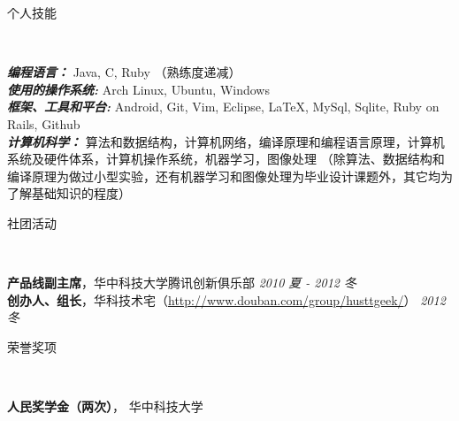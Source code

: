 \documentclass[9pt]{ctexart}
\newenvironment{changemargin}[2]{%
  \begin{list}{}{%
    \setlength{\topsep}{0pt}%
    \setlength{\leftmargin}{#1}%
    \setlength{\rightmargin}{#2}%
    \setlength{\listparindent}{\parindent}%
    \setlength{\itemindent}{\parindent}%
    \setlength{\parsep}{\parskip}%
  }%
  \item[]}{\end{list}
}
\newcommand{\lineover}{
	\begin{changemargin}{-0.05in}{-0.05in}
		\vspace*{-8pt}
		\hrulefill \\
		\vspace*{-2pt}
	\end{changemargin}
}
\newcommand{\header}[1]{
	\begin{changemargin}{-0.5in}{-0.5in}
		\scshape{#1}\\
  	\lineover
	\end{changemargin}
}
\newenvironment{body} {
	\vspace*{-16pt}
	\begin{changemargin}{-0.25in}{-0.5in}
  }	
	{\end{changemargin}
}
\begin{document}
\smallskip

\header{个人技能}

\begin{body}
	\vspace{14pt}
	\emph{\textbf{编程语言：}}{} Java, C, Ruby （熟练度递减）\\
	\medskip
	\emph{\textbf{使用的操作系统:}}{} Arch Linux, Ubuntu, Windows \\
	\medskip
	\emph{\textbf{框架、工具和平台:}}{} Android, Git, Vim, Eclipse, \LaTeX, MySql, Sqlite, Ruby on Rails, Github \\
	\medskip
	\emph{\textbf{计算机科学：}}{} 算法和数据结构，计算机网络，编译原理和编程语言原理，计算机系统及硬件体系，计算机操作系统，机器学习，图像处理 （除算法、数据结构和编译原理为做过小型实验，还有机器学习和图像处理为毕业设计课题外，其它均为了解基础知识的程度）

\end{body}

\smallskip


\header{社团活动}

\begin{body}
	\vspace{14pt}
	\textbf{产品线副主席}，华中科技大学腾讯创新俱乐部 \hfill {} \emph{2010 夏 - 2012 冬}\\
	\textbf{创办人、组长}，华科技术宅（\url{http://www.douban.com/group/husttgeek/}） \hfill {} \emph{2012 冬}\\
\end{body}

\smallskip


\header{荣誉奖项}

\begin{body}
	\vspace{14pt}
	\textbf{人民奖学金（两次）}， 华中科技大学\\
	\smallskip
\end{body}
\end{document}
